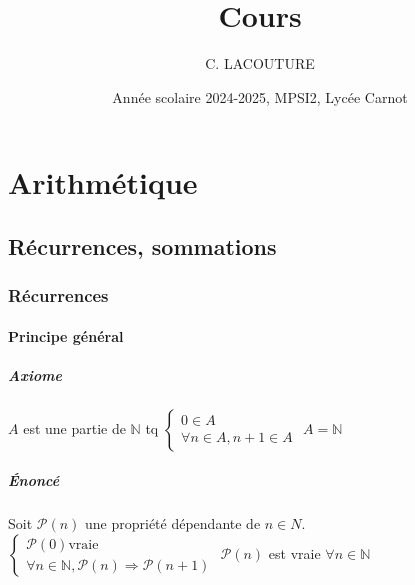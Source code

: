 \documentclass[12pt,a4paper,french]{book}
\title{Cours}
\author{C. LACOUTURE}
\date{Année scolaire 2024-2025, MPSI2, Lycée Carnot}
\begin{document}
	
\maketitle
\tableofcontents
\part{Arithmétique}
\chapter{Récurrences, sommations}
\section{Récurrences}
\subsection{Principe général}
\subsubsection{Axiome}
 $A$ est une partie de $\mathbb{N}$ tq $\left\{ 
\begin{array}{ll}
	0 \in A\\ 
	\forall n \in A, n+1 \in A
\end{array}
\right. $  $A = \mathbb{N}$
\subsubsection{Énoncé}
\begin{framed} Soit $\mathcal{P}(n)$ une propriété dépendante de $n \in N$.
	 $\left\{ 
	\begin{array}{ll}
		\mathcal{P}(0) \mbox{vraie}\\ 
		\forall n \in \mathbb{N}, \mathcal{P}(n) \Rightarrow \mathcal{P}(n+1)
	\end{array}
	\right. $  $\mathcal{P}(n)$ est vraie $\forall n \in \mathbb{N}$
\end{framed}
\end{document}
